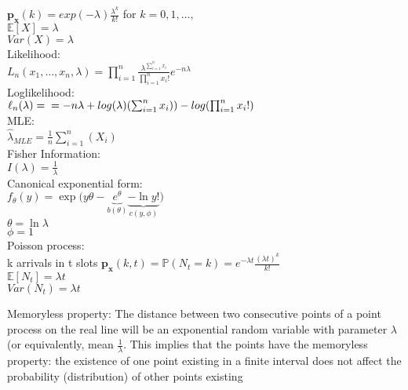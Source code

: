 $\mathbf{p_x}(k)=exp(-\lambda)\frac{\lambda^k}{k!}$ for $k=0,1, \ldots,$\\

$\mathbb{E}[X]=\lambda$\\

$Var(X)=\lambda$\\

Likelihood:\\
$L_ n(x_1, \ldots , x_ n, \lambda) = \prod _{i = 1}^ n \frac{\lambda^{\sum_{i=1}^{n} x_i}}{\prod _{i = 1}^ n x_i!} e^{-n\lambda}$\\

Loglikelihood:\\
$\ell_n (\lambda)= \\
= -n\lambda + log(\lambda)(\sum_{i=1}^n x_i)) - log(\prod _{i = 1}^ n x_i!)$\\

MLE:\\

$\hat{\lambda}_{MLE} = \frac{1}{n} \sum^n_{i=1}(X_i)$\\

Fisher Information:\\

$I(\lambda)= \frac{1}{\lambda}$\\

Canonical exponential form:\\

$ f_{\theta}(y) = \exp\big(y\theta - \underbrace{e^\theta}_{b(\theta)} \underbrace{- \ln y!}_{c(y, \phi)}\big)$\\
$\theta = \ln \lambda$\\
$\phi = 1$\\

Poisson process:\\
k arrivals in t slots
$\mathbf{p_x}(k,t) = \mathbb{P}(N_t=k)=e^{-\lambda t} \frac{(\lambda t)^k}{k!}$\\

$\mathbb{E}[N_t]=\lambda t$\\

$Var(N_t)=\lambda t$

Memoryless property: The distance between two consecutive points of a point process on the real line will be an exponential random variable with parameter $\lambda$  (or equivalently, mean $\frac{1}{\lambda}$. This implies that the points have the memoryless property: the existence of one point existing in a finite interval does not affect the probability (distribution) of other points existing \\

